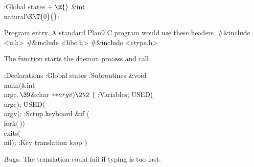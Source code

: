 \B{}:Global states\X${}\mathrel+\E{}$\6
\&{int} \\{natural}${}\K\T{0}{}$;\par
\fi

Program entry. A standard Plan9 C program would use these headers.
\Y\B\8\#\&{include} \.{<u.h>}\6
\8\#\&{include} \.{<libc.h>}\6
\8\#\&{include} \.{<ctype.h>}\par
\fi

The  function starts the daemon process and call .

\Y\B{}:Declarations\X\6
:Global states\X\6
:Subroutines\X\7
\1\1\&{void} \\{main}(\&{int} \\{argc}${},\39{}$\&{char} ${}{*}{*}\\{argv})\2%
\2{}$\6
${}\{{}$\1\6
:Variables\X;\6
\.{USED}(\\{argc});\6
\.{USED}(\\{argv});\6
:Setup keyboard\X\6
\&{if} (\\{fork}(\,))\1\5
\\{exits}(\\{nil});\2\6
:Key translation loop\X\6
\4${}\}{}$\2\par
\fi

Bugs. The translation could fail if typing is too fast.
\fi

\inx
\fin
\con
